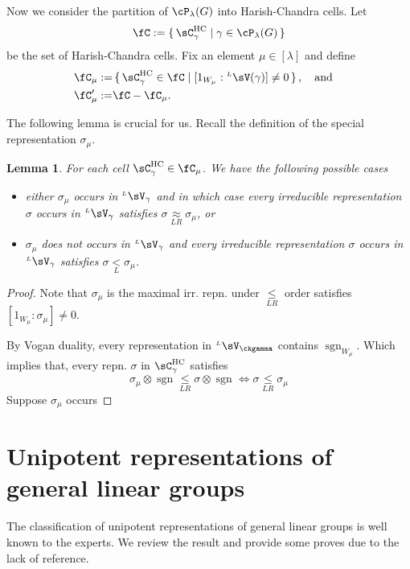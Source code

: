 \documentclass[12pt,a4paper]{amsart}
\newcommand{\sgn}{\operatorname{sgn}}
\numberwithin{equation}{section}
\newtheorem{lem}[thm]{Lemma}
\theoremstyle{remark}
\def\LV{{}^{\scriptscriptstyle L}\sV}
\def\LV{{}^{\scriptscriptstyle L}\sV}
\def\AND{\quad \text{and} \quad}
\def\lneqL{\mathrel{\mathop{<}\limits_{\scriptscriptstyle L}}}
\def\leqLR{\mathrel{\mathop{\leq}\limits_{\scriptscriptstyle LR}}}
\def\approxLR{\mathrel{\mathop{\approx}\limits_{\scriptscriptstyle LR}}}
\begin{document}
Now we consider the partition of $\cP_{\lambda}(G)$ into Harish-Chandra cells.
Let
\[
\fC:= \set{\CHC_{\gamma}|\gamma\in \cP_{\lambda}(G)}
\]
be the set of Harish-Chandra cells.
Fix an element $\mu\in [\lambda]$ and define
\[
\begin{split}
  \fC_{\mu}  := &\set{\CHC_{\gamma} \in \fC| [1_{W_{\mu}}:\LV(\gamma)]\neq 0}, \AND\\
  \fC'_{\mu} :=& \fC - \fC_{\mu}.
\end{split}
\]

The following lemma is crucial for us.
Recall the definition of  the special representation $\sigma_{\mu}$.
\begin{lem}
For each cell $\CHC_{\gamma}\in \fC_{\mu}$.
We have the following possible cases
\begin{itemize}
  \item either
        $\sigma_{\mu}$ occurs in $\LV_{\gamma}$ and in which case every irreducible representation $\sigma$ occurs in  $\LV_{\gamma}$
        satisfies $\sigma\approxLR \sigma_{\mu}$, or
  \item $\sigma_{\mu}$ does not occurs in $\LV_{\gamma}$ and every irreducible representation $\sigma$ occurs in  $\LV_{\gamma}$
        satisfies $\sigma\lneqL \sigma_{\mu}$.
\end{itemize}
\end{lem}
\begin{proof}
  Note that $\sigma_{\mu}$ is the maximal irr. repn. under $\leqLR$ order
  satisfies $[1_{W_{\mu}}: \sigma_{\mu}]\neq 0$.

  By Vogan duality, every representation in $\LV_{\ckgamma}$ contains
  $\sgn_{W_{\mu}}$.
  Which implies that, every repn. $\sigma$ in $\CHC_{\gamma}$  satisfies
  \[
   \sigma_{\mu}\otimes \sgn\leqLR \sigma\otimes \sgn
   \Leftrightarrow \sigma \leqLR \sigma_{\mu}
  \]
  Suppose $\sigma_{\mu}$ occurs

\end{proof}


%



\section{Unipotent representations of general linear groups}

The classification of unipotent representations of general linear groups is well
known to the experts. We review the result and provide some proves due to the
lack of reference.
\end{document}

